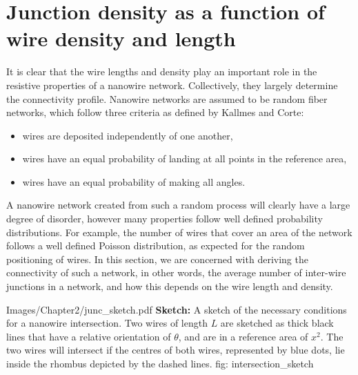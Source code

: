 \section{Junction density as a function of wire density and length}
\label{sec: Junction Density}
It is clear that the wire lengths and density play an important role in the resistive properties of a nanowire network. Collectively, they largely determine the connectivity profile. Nanowire networks are assumed to be random fiber networks, which follow three criteria as defined by Kallmes and Corte\cite{ kallmes1960, sampson2008}:
\begin{itemize}
\item wires are deposited independently of one another,
\item wires have an equal probability of landing at all points in the reference area,
\item wires have an equal probability of making all angles.
\end{itemize}
A nanowire network created from such a random process will clearly have a large degree of disorder, however many properties follow well defined probability distributions. For example, the number of wires that cover an area of the network follows a well defined Poisson distribution\cite{sampson2008}, as expected for the random positioning of wires. In this section, we are concerned with deriving the connectivity of such a network, in other words, the average number of inter-wire junctions in a network, and how this depends on the wire length and density.

{Images/Chapter2/junc_sketch.pdf}
{\textbf{Sketch:} A sketch of the necessary conditions for a nanowire intersection.}
{Two wires of length $L$ are sketched as thick black lines that have a relative orientation of $\theta$, and are in a reference area of $x^2$. The two wires will intersect if the centres of both wires, represented by blue dots, lie inside the rhombus depicted by the dashed lines.}
{fig: intersection_sketch}

